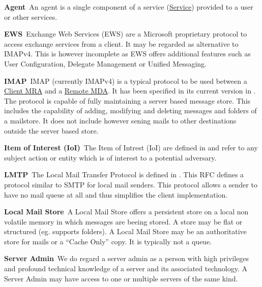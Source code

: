 \documentclass[a4paper,appendixprefix,pdfusetitle,twocolumn,draft,8pt]{scrbook}
\newenvironment{entry}{\par\leavevmode\hangpara{1.5mm}{1}\ignorespaces}{\RaggedRight\par}
\newcommand*{\mainentry}[2]{{\bfseries{#1\label{def:#1}}}~#2\par}
\newcommand*{\defref}[1]{\hyperref[def:#1]{#1}}
\begin{document}
\begin{entry}
  \mainentry{Agent}{An agent is a single component of a service (\defref{Service}) provided to a user or other services.}
\end{entry}

\begin{entry}
  \mainentry{EWS}{Exchange Web Services (EWS) are a Microsoft proprietary protocol to access exchange services from a client. It may be regarded as alternative to IMAPv4. This is however incomplete as EWS offers additional features such as User Configuration, Delegate Management or Unified Messaging.}
\end{entry}

\begin{entry}
  \mainentry{IMAP}{IMAP (currently IMAPv4) is a typical protocol to be used between a \defref{Client MRA} and a \defref{Remote MDA}. It has been specified in its current version in \cite{RFC3501}. The protocol is capable of fully maintaining a server based message store. This includes the capability of adding, modifying and deleting messages and folders of a mailstore. It does not include however sening mails to other destinations outside the server based store.}
\end{entry}

\begin{entry}
	\mainentry{Item of Interest (IoI)}{The Item of Intrest (IoI) are defined in \cite{anon_terminology} and refer to any subject action or entity which is of interest to a potential adversary.}
\end{entry}

\begin{entry}
  \mainentry{LMTP}{The Local Mail Transfer Protocol is defined in \cite{RFC2033}. This RFC defines a protocol similar to SMTP for local mail senders. This protocol allows a sender to have no mail queue at all and thus simplifies the client implementation.}
\end{entry}

\begin{entry}
  \mainentry{Local Mail Store}{A Local Mail Store offers a persistent store on a local non volatile memory in which messages are beeing stored. A store may be flat or structured (eg. supports folders). A Local Mail Store may be an authoritative store for mails or a ``Cache Only'' copy. It is typically not a queue.}
\end{entry}

\begin{entry}
  \mainentry{Server Admin}{We do regard a server admin as a person with high privileges and profound technical knowledge of a server and its associated technology. A Server Admin may have access to one or multiple servers of the same kind.}
\end{entry}
\end{document}
